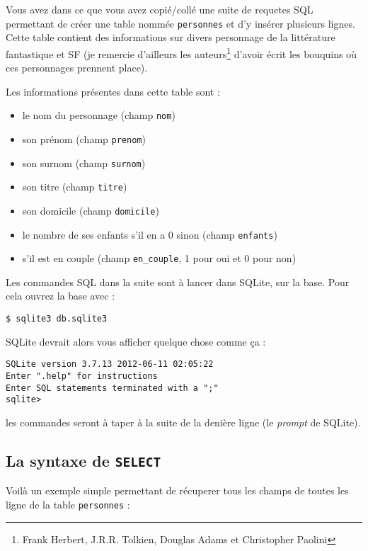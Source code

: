 \documentclass[a4paper, 11pt]{report}
\begin{document}
Vous avez dans ce que vous avez copié/collé une suite de requetes SQL permettant de créer une table nommée \texttt{personnes} et d'y insérer plusieurs lignes.
Cette table contient des informations sur divers personnage de la littérature fantastique et SF (je remercie d'ailleurs les auteurs\footnote{Frank Herbert, J.R.R. Tolkien, Douglas Adams et Christopher Paolini} d'avoir écrit les bouquins où ces personnages prennent place).

Les informations présentes dans cette table sont :

\begin{itemize}
    \item le nom du personnage (champ \texttt{nom})
    \item son prénom (champ \texttt{prenom})
    \item son surnom (champ \texttt{surnom})
    \item son titre (champ \texttt{titre})
    \item son domicile (champ \texttt{domicile})
    \item le nombre de ses enfants s'il en a 0 sinon (champ \texttt{enfants})
    \item s'il est en couple (champ \texttt{en\_couple}, 1 pour oui et 0 pour non)
\end{itemize}

Les commandes SQL dans la suite sont à lancer dans SQLite, sur la base.
Pour cela ouvrez la base avec :

\begin{verbatim}
$ sqlite3 db.sqlite3
\end{verbatim}

SQLite devrait alors vous afficher quelque chose comme ça :

\begin{verbatim}
SQLite version 3.7.13 2012-06-11 02:05:22
Enter ".help" for instructions
Enter SQL statements terminated with a ";"
sqlite>
\end{verbatim}

les commandes seront à taper à la suite de la denière ligne (le {\it prompt} de SQLite).

\subsection{La syntaxe de \texttt{SELECT}}

Voilà un exemple simple permettant de récuperer tous les champs de toutes les ligne de la table \texttt{personnes} :
\end{document}

